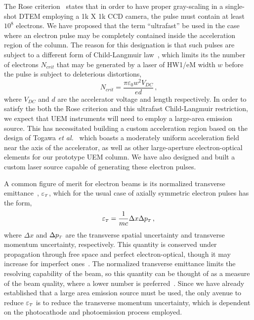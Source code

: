 The Rose criterion~\cite{rose_television_1948} states that in order to have proper gray-scaling in a single-shot DTEM employing a 1k X 1k CCD camera, the pulse must contain at least $10^8$ electrons.
We have proposed that the term ``ultrafast'' be used in the case where an electron pulse may be completely contained inside the acceleration region of the column.
The reason for this designation is that such pulses are subject to a different form of Child-Langmuir law~\cite{child_discharge_1911,langmuir_effect_1923,valfells_effects_2002}, which limits its the number of electrons $N_{crit}$ that may be generated by a laser of HW1/eM width $w$ before the pulse is subject to deleterious distortions,
\begin{equation}
  N_{crit} = \frac{\pi \varepsilon_0 w^2 V_{DC}}{e d} \,\text{,}
\end{equation}
where $V_{DC}$ and $d$ are the accelerator voltage and length respectively.
In order to satisfy the both the Rose criterion and this ultrafast Child-Langmuir restriction, we expect that UEM instruments will need to employ a large-area emission source.
This has necessitated building a custom acceleration region based on the design of Togawa \textit{et al.}~\cite{togawa_ceb6_2007} which boasts a moderately uniform acceleration field near the axis of the accelerator, as well as other large-aperture electron-optical elements for our prototype UEM column.
We have also designed and built a custom laser source capable of generating these electron pulses.

A common figure of merit for electron beams is its normalized transverse emittance~\cite{jensen_emittance_2010}, $\varepsilon_{{\scriptscriptstyle T}}$, which for the usual case of axially symmetric electron pulses has the form,
\begin{equation}
  \varepsilon_{{\scriptscriptstyle T}} = \frac{1}{m c} \Delta x \Delta p_{{\scriptscriptstyle T}} \,\text{,}
\end{equation}
where $\Delta x$ and $\Delta p_{{\scriptscriptstyle T}}$ are the transverse spatial uncertainty and transverse momentum uncertainty, respectively.
This quantity is conserved under propagation through free space and perfect electron-optical, though it may increase for imperfect ones~\cite{oshea_reversible_1998}.
The normalized transverse emittance limits the resolving capability of the beam, so this quantity can be thought of as a measure of the beam quality, where a lower number is preferred~\cite{berger_dc_2009}.
Since we have already established that a large area emission source must be used, the only avenue to reduce $\varepsilon_{{\scriptscriptstyle T}}$ is to reduce the transverse momentum uncertainty, which is dependent on the photocathode and photoemission process employed.

